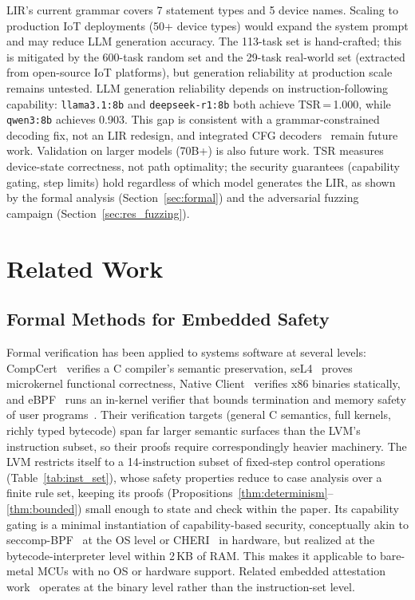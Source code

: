 \documentclass[a4paper,fleqn,longmktitle]{cas-dc}
\begin{document}
LIR's current grammar covers 7 statement types and 5 device names. Scaling to production IoT deployments (50+ device types) would expand the system prompt and may reduce LLM generation accuracy. The 113-task set is hand-crafted; this is mitigated by the 600-task random set and the 29-task real-world set (extracted from open-source IoT platforms), but generation reliability at production scale remains untested. LLM generation reliability depends on instruction-following capability: \texttt{llama3.1:8b} and \texttt{deepseek-r1:8b} both achieve TSR\,=\,1.000, while \texttt{qwen3:8b} achieves 0.903. This gap is consistent with a grammar-constrained decoding fix, not an LIR redesign, and integrated CFG decoders~\citep{outlines} remain future work. Validation on larger models (70B+) is also future work. TSR measures device-state correctness, not path optimality; the security guarantees (capability gating, step limits) hold regardless of which model generates the LIR, as shown by the formal analysis (Section~\ref{sec:formal}) and the adversarial fuzzing campaign (Section~\ref{sec:res_fuzzing}).

\section{Related Work}
\label{sec:related}

\subsection{Formal Methods for Embedded Safety}

Formal verification has been applied to systems software at several levels: CompCert~\citep{compcert} verifies a C compiler's semantic preservation, seL4~\citep{sel4} proves microkernel functional correctness, Native Client~\citep{nacl} verifies x86 binaries statically, and eBPF~\citep{ebpf} runs an in-kernel verifier that bounds termination and memory safety of user programs~\citep{scj}. Their verification targets (general C semantics, full kernels, richly typed bytecode) span far larger semantic surfaces than the LVM's instruction subset, so their proofs require correspondingly heavier machinery. The LVM restricts itself to a 14-instruction subset of fixed-step control operations (Table~\ref{tab:inst_set}), whose safety properties reduce to case analysis over a finite rule set, keeping its proofs (Propositions~\ref{thm:determinism}--\ref{thm:bounded}) small enough to state and check within the paper. Its capability gating is a minimal instantiation of capability-based security, conceptually akin to seccomp-BPF~\citep{seccomp} at the OS level or CHERI~\citep{cheri} in hardware, but realized at the bytecode-interpreter level within 2\,KB of RAM. This makes it applicable to bare-metal MCUs with no OS or hardware support. Related embedded attestation work~\citep{amaris2024embedded_security_survey,zhang2024lightweight_attestation,serpanos2023embedded_security} operates at the binary level rather than the instruction-set level.
\end{document}
